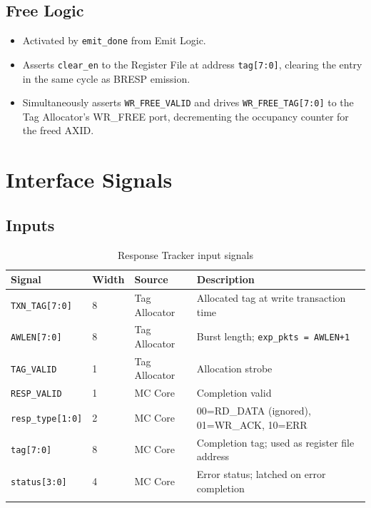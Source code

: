 \documentclass[11pt,a4paper]{article}
\begin{document}
\subsection{Free Logic}

\begin{itemize}
  \item Activated by \texttt{emit\_done} from Emit Logic.
  \item Asserts \texttt{clear\_en} to the Register File at address
        \texttt{tag[7:0]}, clearing the entry in the same cycle as
        BRESP emission.
  \item Simultaneously asserts \texttt{WR\_FREE\_VALID} and drives
        \texttt{WR\_FREE\_TAG[7:0]} to the Tag Allocator's WR\_FREE
        port, decrementing the occupancy counter for the freed AXID.
\end{itemize}

\section{Interface Signals}

\subsection{Inputs}

\begin{longtable}{llll}
\toprule
\textbf{Signal} & \textbf{Width} & \textbf{Source} & \textbf{Description} \\
\midrule
\texttt{TXN\_TAG[7:0]}     & 8 & Tag Allocator & Allocated tag at write transaction time \\
\texttt{AWLEN[7:0]}        & 8 & Tag Allocator & Burst length; \texttt{exp\_pkts = AWLEN+1} \\
\texttt{TAG\_VALID}        & 1 & Tag Allocator & Allocation strobe \\
\texttt{RESP\_VALID}       & 1 & MC Core       & Completion valid \\
\texttt{resp\_type[1:0]}   & 2 & MC Core       & 00=RD\_DATA (ignored), 01=WR\_ACK, 10=ERR \\
\texttt{tag[7:0]}          & 8 & MC Core       & Completion tag; used as register file address \\
\texttt{status[3:0]}       & 4 & MC Core       & Error status; latched on error completion \\
\bottomrule
\caption{Response Tracker input signals}
\end{longtable}
\end{document}
